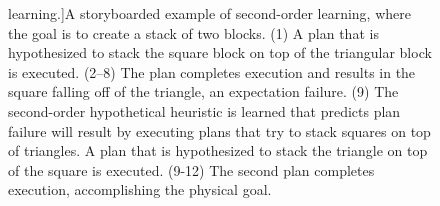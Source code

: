 \begin{figure}
  learning.]{A storyboarded example of second-order learning, where
  the goal is to create a stack of two blocks.  (1) A plan that is
  hypothesized to stack the square block on top of the triangular
  block is executed.  (2--8) The plan completes execution and results
  in the square falling off of the triangle, an expectation failure.
  (9) The second-order hypothetical heuristic is learned that predicts
  plan failure will result by executing plans that try to stack
  squares on top of triangles.  A plan that is hypothesized to stack
  the triangle on top of the square is executed.  (9-12) The second
  plan completes execution, accomplishing the physical goal.}
\label{figure:implemented_example_learning_storyboard}
\end{figure}
